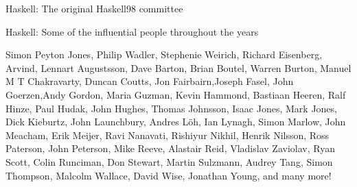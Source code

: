 \documentclass[pdf]{beamer}
\begin{document}
\begin{frame}{Haskell: The original Haskell98 committee}
  \begin{figure}[H]
    \centering

  \end{figure}
  \end{frame}

  \begin{frame}{Haskell: Some of the influential people throughout the years}

      {\small Simon Peyton Jones, Philip Wadler, Stephenie Weirich, Richard Eisenberg, Arvind, Lennart Augustsson, Dave Barton, Brian Boutel, Warren Burton, Manuel M T Chakravarty, Duncan Coutts, Jon Fairbairn,Joseph Fasel, John Goerzen,Andy Gordon, Maria Guzman, Kevin Hammond, Bastiaan Heeren, Ralf Hinze, Paul Hudak, John Hughes, Thomas Johnsson, Isaac Jones, Mark Jones, Dick Kieburtz, John Launchbury, Andres Löh, Ian Lynagh, Simon Marlow, John Meacham, Erik Meijer, Ravi Nanavati, Rishiyur Nikhil, Henrik Nilsson, Ross Paterson, John Peterson, Mike Reeve, Alastair Reid, Vladislav Zaviolav, Ryan Scott, Colin Runciman, Don Stewart, Martin Sulzmann, Audrey Tang, Simon Thompson, Malcolm Wallace, David Wise, Jonathan Young, and many more!}
\end{frame}
\end{document}
